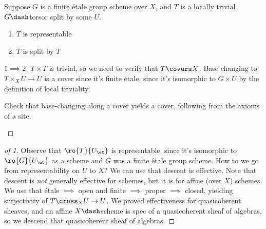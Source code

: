 \begin{example}[?]

Suppose \(G\) is a finite étale group scheme over \(X\), and \(T\) is a
locally trivial \(G\dash\)torsor split by some \(U\).

\begin{claim}

\envlist

\begin{enumerate}
\def\labelenumi{\arabic{enumi}.}
\item
  \(T\) is representable
\item
  \(T\) is split by \(T\)
\end{enumerate}

\end{claim}

\begin{proof}[$1\implies 2$]

\(T\times T\) is trivial, so we need to verify that \(T \covers X\).
Base changing to \(T\times_X U \to U\) is a cover since it's finite
étale, since it's isomorphic to \(G\times U\) by the definition of local
triviality.

\begin{exercise}[?]

Check that base-changing along a cover yields a cover, following from
the axioms of a site.

\end{exercise}

\end{proof}

\begin{proof}[of 1]

Observe that \(\ro{T}{U_\et}\) is representable, since it's isomorphic
to \(\ro{G}{U_\et}\) as a scheme and \(G\) was a finite étale group
scheme. How to we go from representability on \(U\) to \(X\)? We can use
that descent is effective. Note that descent is \emph{not} generally
effective for schemes, but it is for affine (over \(X\)) schemes. We use
that étale \(\implies\) open and finite \(\implies\) proper \(\implies\)
closed, yielding surjectivity of \(T\cross_X U \to U\). We proved
effectiveness for quasicoherent sheaves, and an affine \(X\dash\)scheme
is spec of a quasicoherent sheaf of algebras, so we descend that
quasicoherent sheaf of algebras.

\end{proof}

\end{example}

